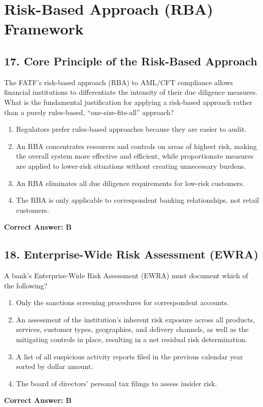 \documentclass[11pt,a4paper]{article}
\begin{document}
	\section{Risk-Based Approach (RBA) Framework}
	
	\subsection{17. Core Principle of the Risk-Based Approach}
	The FATF's risk-based approach (RBA) to AML/CFT compliance allows financial institutions to differentiate the intensity of their due diligence measures. What is the fundamental justification for applying a risk-based approach rather than a purely rules-based, ``one-size-fits-all'' approach?
	\begin{enumerate}[label=\Alph*.]
		\item Regulators prefer rules-based approaches because they are easier to audit.
		\item An RBA concentrates resources and controls on areas of highest risk, making the overall system more effective and efficient, while proportionate measures are applied to lower-risk situations without creating unnecessary burdens.
		\item An RBA eliminates all due diligence requirements for low-risk customers.
		\item The RBA is only applicable to correspondent banking relationships, not retail customers.
	\end{enumerate}
	\textbf{Correct Answer: B}
	
	\subsection{18. Enterprise-Wide Risk Assessment (EWRA)}
	A bank's Enterprise-Wide Risk Assessment (EWRA) must document which of the following?
	\begin{enumerate}[label=\Alph*.]
		\item Only the sanctions screening procedures for correspondent accounts.
		\item An assessment of the institution's inherent risk exposure across all products, services, customer types, geographies, and delivery channels, as well as the mitigating controls in place, resulting in a net residual risk determination.
		\item A list of all suspicious activity reports filed in the previous calendar year sorted by dollar amount.
		\item The board of directors' personal tax filings to assess insider risk.
	\end{enumerate}
	\textbf{Correct Answer: B}
	
\end{document}
